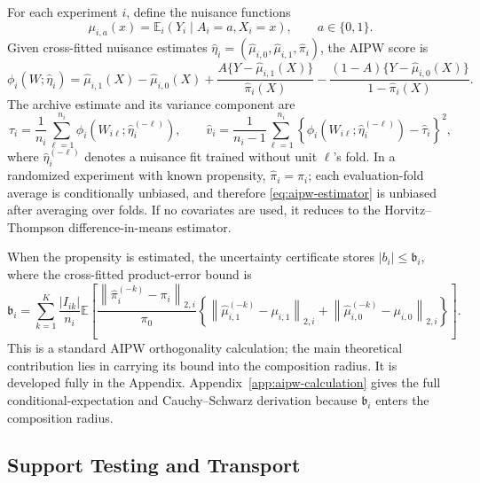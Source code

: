 \documentclass[11pt]{article}
\numberwithin{equation}{section}
\newcommand{\E}{\mathbb E}
\newcommand{\1}{\mathbf 1}
\newcommand{\norm}[1]{\left\lVert #1\right\rVert}
\newcommand{\abs}[1]{\left\lvert #1\right\rvert}
\begin{document}
For each experiment \(i\), define the nuisance functions
\[
  \mu_{i,a}(x)=\E_i(Y_i\mid A_i=a,X_i=x),\qquad a\in\{0,1\}.
\]
Given cross-fitted nuisance estimates \(\widehat\eta_i=(\widehat\mu_{i,0},\widehat\mu_{i,1},\widehat\pi_i)\), the AIPW score is
\begin{equation}
\label{eq:aipw-score}
  \phi_i(W;\widehat\eta_i)
  =
  \widehat\mu_{i,1}(X)-\widehat\mu_{i,0}(X)
  +\frac{A\{Y-\widehat\mu_{i,1}(X)\}}{\widehat\pi_i(X)}
  -\frac{(1-A)\{Y-\widehat\mu_{i,0}(X)\}}{1-\widehat\pi_i(X)}.
\end{equation}
The archive estimate and its variance component are
\begin{equation}
\label{eq:aipw-estimator}
  \widehat\tau_i
  =
  \frac1{n_i}\sum_{\ell=1}^{n_i}\phi_i(W_{i\ell};\widehat\eta_i^{(-\ell)}),
  \qquad
  \widehat v_i
  =
  \frac1{n_i-1}\sum_{\ell=1}^{n_i}
  \left\{
    \phi_i(W_{i\ell};\widehat\eta_i^{(-\ell)})-\widehat\tau_i
  \right\}^2,
\end{equation}
where \(\widehat\eta_i^{(-\ell)}\) denotes a nuisance fit trained without unit \(\ell\)'s fold.  In a randomized experiment with known propensity, \(\widehat\pi_i=\pi_i\); each evaluation-fold average is conditionally unbiased, and therefore \eqref{eq:aipw-estimator} is unbiased after averaging over folds.  If no covariates are used, it reduces to the Horvitz--Thompson difference-in-means estimator.

When the propensity is estimated, the uncertainty certificate stores
\(\abs{b_i}\le\mathfrak b_i\), where the cross-fitted product-error bound is
\begin{equation}
\label{eq:nuisance-remainder}
  \mathfrak b_i
  =
  \sum_{k=1}^K\frac{|I_{ik}|}{n_i}
  \E\!\left[
    \frac{\norm{\widehat\pi_i^{(-k)}-\pi_i}_{2,i}}{\pi_0}
    \left\{
      \norm{\widehat\mu_{i,1}^{(-k)}-\mu_{i,1}}_{2,i}
      +\norm{\widehat\mu_{i,0}^{(-k)}-\mu_{i,0}}_{2,i}
    \right\}
  \right].
\end{equation}
This is a standard AIPW orthogonality calculation; the main theoretical contribution lies in carrying its bound into the composition radius.
It is developed fully in the Appendix.  Appendix~\ref{app:aipw-calculation} gives the full
conditional-expectation and Cauchy--Schwarz derivation because
\(\mathfrak b_i\) enters the composition radius.

\subsection{Support Testing and Transport}
\end{document}
